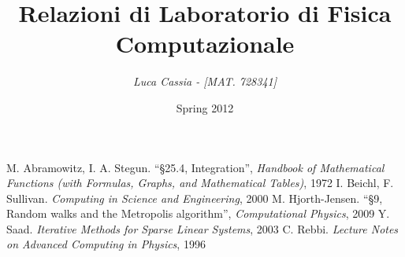 \documentclass[a4paper,11pt]{report}
\title{\bfseries{\Huge{Relazioni di Laboratorio di Fisica Computazionale}}}
\author{\textit {Luca Cassia - [MAT. 728341]}}
\date{Spring 2012}
\begin{document}
\maketitle
\tableofcontents






\begin{thebibliography}{9}
 M. Abramowitz, I. A. Stegun. ``§25.4, Integration'', \textit{Handbook of Mathematical Functions (with Formulas, Graphs, and Mathematical Tables)}, 1972
 I. Beichl, F. Sullivan. \textit{Computing in Science and Engineering}, 2000
 M. Hjorth-Jensen. ``§9, Random walks and the Metropolis algorithm'', \textit{Computational Physics}, 2009
 Y. Saad. \textit{Iterative Methods for Sparse Linear Systems}, 2003
 C. Rebbi. \textit{Lecture Notes on Advanced Computing in Physics}, 1996
\end{thebibliography} 
\end{document}
